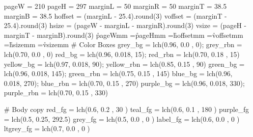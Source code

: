 \setpcodes{\rm}%
\setpcodes{\it}%
\setpcodes{\bf}%
\setpcodes{\caps}%
\setpcodes{\icap}%
\def\url#1#2{%
  \special{pdf:bann <<
    /Subtype /Link
    /A << %
      /S /URI %
      /URI (#1)
    >>
    /Border [ 0 0 0 ] %
    /C [ 1 0 0 ] %
  >>}%
  #2\special{pdf:eann}%
}%
\def\qt{\kern -1.0pt}%
\def\ot{\kern  0.5pt}%
\def\pt{\kern  1.0pt}%
\def\dt{\kern  2.0pt}%
\def\fem{\hskip 0.200em}%
\def\qem{\hskip 0.250em}%
\def\tem{\hskip 0.333em}%
\def\hem{\hskip 0.500em}%
\def\em {\hskip 1.000em}%
\def\dem{\hskip 2.000em}%
\beginruby
  pageW   = 210
  pageH   = 297
  marginL =  50
  marginR =  50
  marginT =  38.5
  marginB =  38.5
  hoffset = (marginL - 25.4).round(3)
  voffset = (marginT - 25.4).round(3)
  hsize   = (pageW - marginL - marginR).round(3)
  vsize   = (pageH - marginT - marginB).round(3)
\endruby
\pdfpagewidth\r{pageW}mm
\pdfpageheight=\r{pageH}mm
\hoffset=\r{hoffset}mm
\voffset=\r{voffset}mm
\hsize=\r{hsize}mm
\vsize=\r{vsize}mm
\baselineskip=16pt
\parskip=8pt
\parindent=0pt
\raggedbottom
\nopagenumbers
\beginruby
  # Color Boxes
    grey_bg = lch(0.96, 0.0  ,   0);   grey_rbn = lch(0.70, 0.0  ,   0)
     red_bg = lch(0.96, 0.018,  15);    red_rbn = lch(0.70, 0.18 ,  15)
  yellow_bg = lch(0.97, 0.018,  90); yellow_rbn = lch(0.85, 0.15 ,  90)
   green_bg = lch(0.96, 0.018, 145);  green_rbn = lch(0.75, 0.15 , 145)
    blue_bg = lch(0.96, 0.018, 270);   blue_rbn = lch(0.70, 0.15 , 270)
  purple_bg = lch(0.96, 0.018, 330); purple_rbn = lch(0.70, 0.15 , 330)

  # Body copy
     red_fg = lch(0.6, 0.2 ,  30  )
    teal_fg = lch(0.6, 0.1 , 180  )
  purple_fg = lch(0.5, 0.25, 292.5)
    grey_fg = lch(0.5, 0.0 ,   0  )
   label_fg = lch(0.6, 0.0 ,   0  )
  ltgrey_fg = lch(0.7, 0.0 ,   0  )


